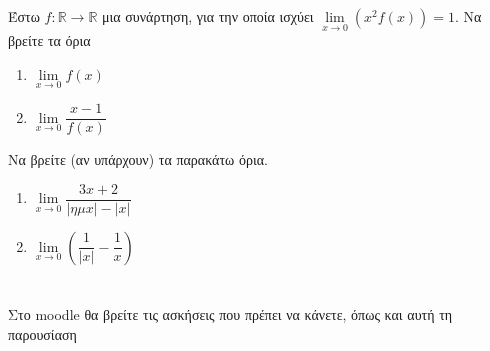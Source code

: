 \documentclass{presentation}
\begin{document}
\begin{askisi}
  Έστω $f:\mathbb{R}\to\mathbb{R}$ μια συνάρτηση, για την οποία ισχύει $\lim\limits_{x \to 0}{ \left( x^2f(x)  \right)  }=1$.
  Να βρείτε τα όρια
  \begin{enumerate}
    \item $\lim\limits_{x \to 0}{ f(x) }$ \pause
    \item $\lim\limits_{x \to 0}{ \dfrac{x-1}{f(x)} }$
  \end{enumerate}
\end{askisi}

\begin{askisi}
  Να βρείτε (αν υπάρχουν) τα παρακάτω όρια.
  \begin{enumerate}
    \item $\lim\limits_{x \to 0}{ \dfrac{3x+2}{|ημx|-|x|} }$ \pause
    \item $\lim\limits_{x \to 0}{ \left( \dfrac{1}{|x|}-\dfrac{1}{x}  \right)  }$
  \end{enumerate}
\end{askisi}

\section{}
\begin{frame}
  Στο moodle θα βρείτε τις ασκήσεις που πρέπει να κάνετε, όπως και αυτή τη παρουσίαση
\end{frame}
\end{document}
